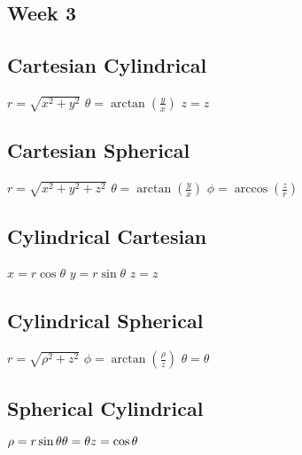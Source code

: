 \documentclass[12pt]{article}
\begin{document}
\begin{paracol}{2}
        \section*{Week 3}

        \subsection*{Cartesian \guillemotright Cylindrical}
        $r = \sqrt{x^2+y^2}$ \newline
        $\theta = \arctan(\frac{y}{x})$ \newline
        $z=z$

        \subsection*{Cartesian \guillemotright Spherical}
        $r=\sqrt{x^2+y^2+z^2}$ \newline
        $\theta = \arctan(\frac{y}{x})$ \newline
        $\phi = \arccos(\frac{z}{r})$ \newline

        \subsection*{Cylindrical \guillemotright Cartesian}
        $x = r \cos\theta$ \newline
        $y = r \sin\theta$ \newline
        $z = z$ \newline
        \switchcolumn
        \subsection*{Cylindrical \guillemotright Spherical}
        $r=\sqrt{\rho^2 + z^2}$ \newline
        $\phi = \arctan(\frac{\rho}{z})$ \newline
        $\theta = \theta$

        \subsection*{Spherical \guillemotright Cylindrical}
        \begin{fleqn}
            $
            \rho = r \sin \theta \newline
            \theta = \theta \newline
            z = \cos \theta \newline
            $
        \end{fleqn}


\end{paracol}
\end{document}
